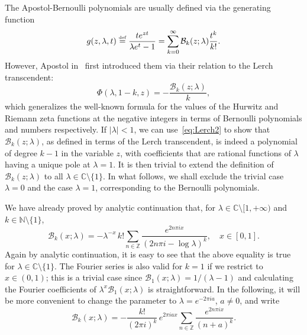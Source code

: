 \documentclass[11pt,a4paper,reqno]{amsart}
\newcommand{\B}{\mathcal{B}}
\newcommand{\C}{\mathbb{C}}
\newcommand{\N}{\mathbb{N}}
\newcommand{\Z}{\mathbb{Z}}
\theoremstyle{plain}
\theoremstyle{remark}
\numberwithin{equation}{section}
\begin{document}
The Apostol-Bernoulli polynomials are usually defined via the generating function 
\begin{equation}
\label{eq:GF-AB}
  g(z,\lambda,t) \stackrel{\text{\tiny def}}{=}
    \frac{t e^{zt}}{\lambda e^{t} - 1}
  = \sum_{k=0}^{\infty} \B_{k}(z;\lambda) \frac{t^{k}}{k!}.
\end{equation}
However, Apostol in~\cite{Ap} first introduced them via their relation to the Lerch transcendent:
\begin{equation}
\label{eq:defABviaLerch}
  \Phi(\lambda,1-k,z) = -\frac{\B_k(z;\lambda)}{k},
\end{equation}
which generalizes the well-known formula for the values of the Hurwitz and Riemann zeta functions at the negative integers in terms of Bernoulli polynomials and numbers respectively. If $|\lambda|<1$, we can use~\eqref{eq:Lerch2} to show that $\B_k(z;\lambda)$, as defined in terms of the Lerch transcendent, is indeed a polynomial of degree $k-1$ in the variable $z$, with coefficients that are rational functions of $\lambda$ having a unique pole at $\lambda = 1$. It is then trivial to extend the definition of $\B_{k}(z;\lambda)$ to all $\lambda\in\C\setminus\{1\}$. In what follows, we shall exclude the trivial case $\lambda=0$ and the case $\lambda=1$, corresponding to the Bernoulli polynomials.


We have already proved by analytic continuation that, for $\lambda\in\C\setminus[1,+\infty)$ and $k\in \N \setminus \{1\}$,
\begin{equation}
\label{eq:FSApostolBer}
  \B_k(x;\lambda) = -\lambda^{-x}\,k! \sum_{n\in\Z} \frac{e^{2n\pi i x}}{(2n\pi i-\log\lambda)^k},
  \quad x\in[0,1].
\end{equation}
Again by analytic continuation, it is easy to see that the above equality is true for $\lambda \in \C\setminus\{1\}$. The Fourier series is also valid for $k=1$ if we restrict to $x\in (0,1)$; this is a trivial case since $\B_1(x;\lambda) = 1/(\lambda-1)$ and calculating the Fourier coefficients of $\lambda^x \B_1(x;\lambda)$ is straightforward. In the following, it will be more convenient to change the parameter to $\lambda=e^{-2\pi ia}$, $a\not=0$, and write 
\begin{equation*}
  \B_k(x;\lambda) = -\frac{k!}{(2\pi i)^k} \, e^{2\pi i ax} \sum_{n\in\Z} \frac{e^{2n\pi i x}}{(n+a)^k}.
\end{equation*}
\end{document}
